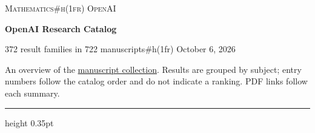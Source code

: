 \documentclass[11pt,a4paper]{article}
\begin{document}
{\small\scshape Mathematics#h(1fr)  OpenAI\par}
\vspace{5pt}
{\LARGE\bfseries OpenAI Research Catalog\par}
\vspace{4pt}
{\small 372 result families in 722 manuscripts#h(1fr)  October 6, 2026\par}
\vspace{7pt}
{\small An overview of the \href{https://github.com/openai/math}{manuscript collection}. Results are grouped by subject; entry numbers follow the catalog order and do not indicate a ranking. PDF links follow each summary.\par}
\vspace{8pt}\hrule height 0.35pt\vspace{5pt}
\end{document}
